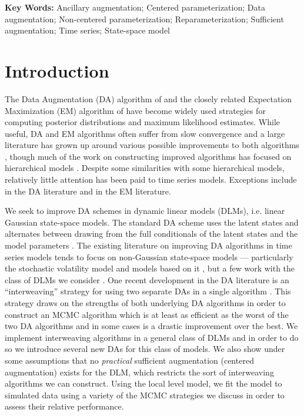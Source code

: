 \documentclass[12pt]{article}
\begin{document}
\noindent%
{\bf Key Words:} Ancillary augmentation; Centered parameterization; Data augmentation; Non-centered parameterization; Reparameterization; Sufficient augmentation; Time series; State-space model


\section{Introduction}

The Data Augmentation (DA) algorithm of \citet{tanner1987calculation} and the closely related Expectation Maximization (EM) algorithm of \citet{dempster1977maximum} have become widely used strategies for computing posterior distributions and maximum likelihood estimates. While useful, DA and EM algorithms often suffer from slow convergence and a large literature has grown up around various possible improvements to both algorithms \citep{meng1997algorithm,meng1999seeking,liu1999parameter,hobert2008theoretical,yu2011center}, though much of the work on constructing improved algorithms has focused on hierarchical models \citep{gelfand1995efficient,roberts1997updating,meng1998fast,van2001art,bernardo2003non,papaspiliopoulos2007general,papaspiliopoulos2008stability}. Despite some similarities with some hierarchical models, relatively little attention has been paid to time series models. Exceptions include \citet{pitt1999analytic,fruhwirth2003bayesian,fruhwirth2006auxiliary} in the DA literature and \citet{van2003one} in the EM literature. 

We seek to improve DA schemes in dynamic linear models (DLMs), i.e. linear Gaussian state-space models. The standard DA scheme uses the latent states and alternates between drawing from the full conditionals of the latent states and the model parameters \citep{fruhwirth1994data,carter1994gibbs}. The existing literature on improving DA algorithms in time series models tends to focus on non-Gaussian state-space models --- particularly the stochastic volatility model and models based on it \citep{shephard1996statistical,fruhwirth2003bayesian,roberts2004bayesian,bos2006inference,strickland2008parameterisation,fruhwirth2008heston,kastner2013ancillarity}, but a few work with the class of DLMs we consider \citep{fruhwirth2004efficient}. One recent development in the DA literature is an ``interweaving'' strategy for using two separate DAs in a single algorithm \citep{yu2011center}. This strategy draws on the strengths of both underlying DA algorithms in order to construct an MCMC algorithm which is at least as efficient as the worst of the two DA algorithms and in some cases is a drastic improvement over the best. We implement interweaving algorithms in a general class of DLMs and in order to do so we introduce several new DAs for this class of models. We also show under some assumptions that no {\it practical} sufficient augmentation (centered augmentation) exists for the DLM, which restricts the sort of interweaving algorithms we can construct. Using the local level model, we fit the model to simulated data using a variety of the MCMC strategies we discuss in order to assess their relative performance.
\end{document}
